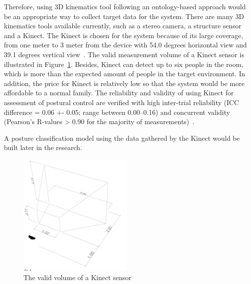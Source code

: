 Therefore, using 3D kinematics tool following an ontology-based approach would be an appropriate way to collect target data for the system. There are many 3D kinematics tools available currently, such as a stereo camera, a structure sensor and a Kinect. The Kinect is chosen for the system because of its large coverage, from one meter to 3 meter from the device with 54.0 degrees horizontal view and 39.1 degrees vertical view~\cite{evaluation_kinect_workspace}. The valid measurement volume of a Kinect sensor is illustrated in Figure~\ref{fig:kinect_coverage}. Besides, Kinect can detect up to six people in the room, which is more than the expected amount of people in the target environment. In addition, the price for Kinect is relatively low so that the system would be more affordable to a normal family. The reliability and validity of using Kinect for assessment of postural control are verified with high inter-trial reliability (ICC difference = 0.06 +- 0.05; range between 0.00–0.16) and concurrent validity (Pearson’s R-values > 0.90 for the majority of measurements)~\cite{validity_kinect_postural_control}.

A posture classification model using the data gathered by the Kinect would be built later in the research.

\begin{figure}[h]
\centering
    \includegraphics[width=0.5\textwidth]{figs/kinect_coverage}
\caption{The valid volume of a Kinect sensor~\cite{evaluation_kinect_workspace}}
\label{fig:kinect_coverage}
\end{figure}

